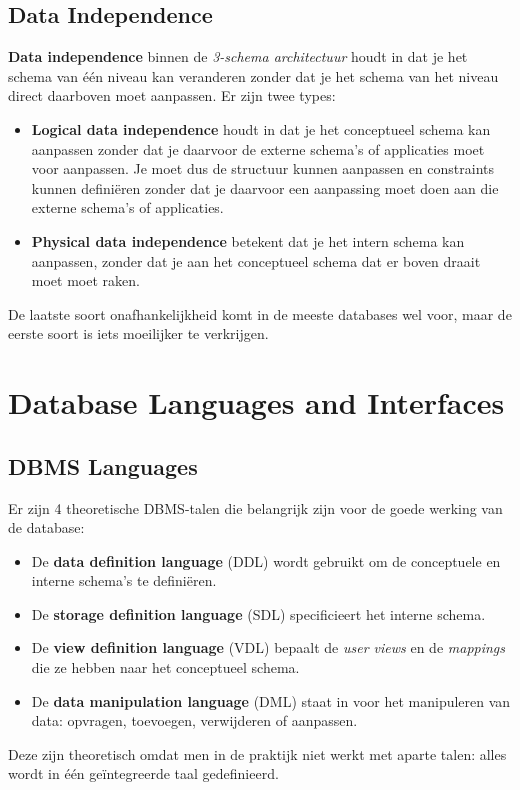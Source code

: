 \subsection{Data Independence}
\textbf{Data independence} binnen de \textit{3-schema architectuur} houdt in dat je het schema van \'e\'en niveau kan veranderen zonder dat je het schema van het niveau direct daarboven moet aanpassen. Er zijn twee types:
\begin{itemize}
\item \textbf{Logical data independence} houdt in dat je het conceptueel schema kan aanpassen zonder dat je daarvoor de externe schema's of applicaties moet voor aanpassen. Je moet dus de structuur kunnen aanpassen en constraints kunnen defini\"eren zonder dat je daarvoor een aanpassing moet doen aan die externe schema's of applicaties.
\item \textbf{Physical data independence} betekent dat je het intern schema kan aanpassen, zonder dat je aan het conceptueel schema dat er boven draait moet moet raken.
\end{itemize}
De laatste soort onafhankelijkheid komt in de meeste databases wel voor, maar de eerste soort is iets moeilijker te verkrijgen.


\section{Database Languages and Interfaces}
\subsection{DBMS Languages}
Er zijn 4 theoretische DBMS-talen die belangrijk zijn voor de goede werking van de database:
\begin{itemize}
\item De \textbf{data definition language} (DDL) wordt gebruikt om de conceptuele en interne schema's te defini\"eren.
\item De \textbf{storage definition language} (SDL) specificieert het interne schema.
\item De \textbf{view definition language} (VDL) bepaalt de \textit{user views} en de \textit{mappings} die ze hebben naar het conceptueel schema.
\item De \textbf{data manipulation language} (DML) staat in voor het manipuleren van data: opvragen, toevoegen, verwijderen of aanpassen.
\end{itemize}
Deze zijn theoretisch omdat men in de praktijk niet werkt met aparte talen: alles wordt in \'e\'en ge\"integreerde taal gedefinieerd.

